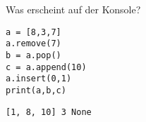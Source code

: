 \question[3]
Was erscheint auf der Konsole?
\begin{lstlisting}
a = [8,3,7]
a.remove(7)
b = a.pop()
c = a.append(10)
a.insert(0,1)
print(a,b,c)
\end{lstlisting}
\begin{solutionbox}{1cm}
\texttt{[1, 8, 10] 3 None}
\end{solutionbox}

